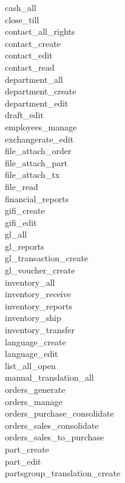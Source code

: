 \begin{description}
\item [cash\_all]
\item [close\_till]
\item [contact\_all\_rights]
\item [contact\_create]
\item [contact\_edit]
\item [contact\_read]
\item [department\_all]
\item [department\_create]
\item [department\_edit]
\item [draft\_edit]
\item [employees\_manage]
\item [exchangerate\_edit]
\item [file\_attach\_order]
\item [file\_attach\_part]
\item [file\_attach\_tx]
\item [file\_read]
\item [financial\_reports]
\item [gifi\_create]
\item [gifi\_edit]
\item [gl\_all]
\item [gl\_reports]
\item [gl\_transaction\_create]
\item [gl\_voucher\_create]
\item [inventory\_all]
\item [inventory\_receive]
\item [inventory\_reports]
\item [inventory\_ship]
\item [inventory\_transfer]
\item [language\_create]
\item [language\_edit]
\item [list\_all\_open]
\item [manual\_translation\_all]
\item [orders\_generate]
\item [orders\_manage]
\item [orders\_purchase\_consolidate]
\item [orders\_sales\_consolidate]
\item [orders\_sales\_to\_purchase]
\item [part\_create]
\item [part\_edit]
\item [partsgroup\_translation\_create]

\end{description}
